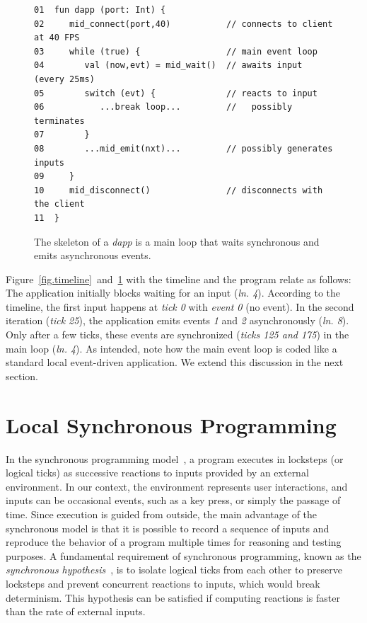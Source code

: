 \documentclass[sigplan,screen]{acmart}
\newcommand{\lin}[1]{(\emph{ln. #1}\xspace)}
\newcommand{\dapp}{\emph{dapp}\xspace}
\begin{document}
\begin{figure}[t]
{\scriptsize
\begin{verbatim}
01  fun dapp (port: Int) {
02     mid_connect(port,40)           // connects to client at 40 FPS
03     while (true) {                 // main event loop
04        val (now,evt) = mid_wait()  // awaits input (every 25ms)
05        switch (evt) {              // reacts to input
06           ...break loop...         //   possibly terminates
07        }
08        ...mid_emit(nxt)...         // possibly generates inputs
09     }
10     mid_disconnect()               // disconnects with the client
11  }
\end{verbatim}
}
  \caption{
    \label{fig.skel}
    The skeleton of a \dapp is a main loop that waits synchronous and emits
    asynchronous events.
  }
\end{figure}

Figure~\ref{fig.timeline}~and~\ref{fig.skel} with the timeline and the program
relate as follows:
The application initially blocks waiting for an input \lin{4}.
According to the timeline, the first input happens at \emph{tick 0} with
\emph{event 0} (no event).
In the second iteration (\emph{tick 25}), the application emits events \emph{1}
and \emph{2} asynchronously \lin{8}.
Only after a few ticks, these events are synchronized (\emph{ticks 125 and 175})
in the main loop \lin{4}.
As intended, note how the main event loop is coded like a standard local
event-driven application.
We extend this discussion in the next section.

\section{Local Synchronous Programming}
\label{sec.sync}

In the synchronous programming model~\cite{sync}, a program executes in
locksteps (or logical ticks) as successive reactions to inputs provided by an
external environment.
In our context, the environment represents user interactions, and inputs can be
occasional events, such as a key press, or simply the passage of time.
Since execution is guided from outside, the main advantage of the synchronous
model is that it is possible to record a sequence of inputs and reproduce the
behavior of a program multiple times for reasoning and testing purposes.
A fundamental requirement of synchronous programming, known as the
\emph{synchronous hypothesis}~\cite{hypo}, is to isolate logical ticks from
each other to preserve locksteps and prevent concurrent reactions to inputs,
which would break determinism.
This hypothesis can be satisfied if computing reactions is faster than the rate
of external inputs.
\end{document}
